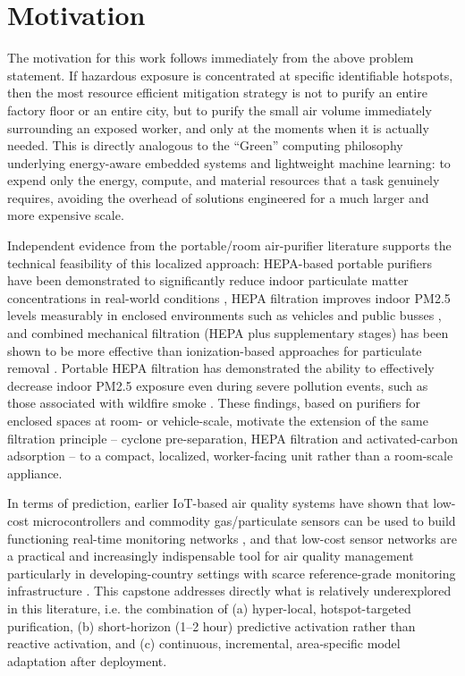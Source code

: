 \section{Motivation}
\label{sec:motivation}

The motivation for this work follows immediately from the above problem statement. If hazardous exposure is concentrated at specific identifiable hotspots, then the most resource efficient mitigation strategy is not to purify an entire factory floor or an entire city, but to purify the small air volume immediately surrounding an exposed worker, and only at the moments when it is actually needed. This is directly analogous to the “Green” computing philosophy underlying energy-aware embedded systems and lightweight machine learning: to expend only the energy, compute, and material resources that a task genuinely requires, avoiding the overhead of solutions engineered for a much larger and more expensive scale.

Independent evidence from the portable/room air-purifier literature supports the technical feasibility of this localized approach: HEPA-based portable purifiers have been demonstrated to significantly reduce indoor particulate matter concentrations in real-world conditions \citep{lu2023realworld,cox2018effectiveness}, HEPA filtration improves indoor PM2.5 levels measurably in enclosed environments such as vehicles and public busses \citep{lee2022effect,chen2022efficacy}, and combined mechanical filtration (HEPA plus supplementary stages) has been shown to be more effective than ionization-based approaches for particulate removal \citep{dubey2021assessing,szczotko2022review}. Portable HEPA filtration has demonstrated the ability to effectively decrease indoor PM2.5 exposure even during severe pollution events, such as those associated with wildfire smoke \citep{chen2025fine}. These findings, based on purifiers for enclosed spaces at room- or vehicle-scale, motivate the extension of the same filtration principle -- cyclone pre-separation, HEPA filtration and activated-carbon adsorption -- to a compact, localized, worker-facing unit rather than a room-scale appliance.

In terms of prediction, earlier IoT-based air quality systems have shown that low-cost microcontrollers and commodity gas/particulate sensors can be used to build functioning real-time monitoring networks \citep{alam2025iot,zhang2020realtime,kataria2022aiiot,mani2021aipowered}, and that low-cost sensor networks are a practical and increasingly indispensable tool for air quality management particularly in developing-country settings with scarce reference-grade monitoring infrastructure \citep{shabbir2025paradigm}. This capstone addresses directly what is relatively underexplored in this literature, i.e. the combination of (a) hyper-local, hotspot-targeted purification, (b) short-horizon (1--2 hour) predictive activation rather than reactive activation, and (c) continuous, incremental, area-specific model adaptation after deployment.

